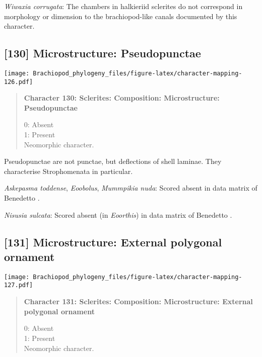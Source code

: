 \documentclass[openany]{book}
\theoremstyle{definition}
\theoremstyle{definition}
\theoremstyle{definition}
\theoremstyle{remark}
\begin{document}
\hypertarget{Wiwaxia_corrugata-coding-129}{}
\emph{Wiwaxia corrugata}: The chambers in halkieriid sclerites do not
correspond in morphology or dimension to the brachiopod-like canals
documented by this character.

\subsection*{{[}130{]} Microstructure:
Pseudopunctae}\label{microstructure-pseudopunctae}

\texttt{[image: Brachiopod\_phylogeny\_files/figure-latex/character-mapping-126.pdf]}

\begin{quote}
\textbf{Character 130: Sclerites: Composition: Microstructure:
Pseudopunctae}

0: Absent\\
1: Present\\
Neomorphic character.
\end{quote}

Pseudopunctae are not punctae, but deflections of shell laminae. They
characterise Strophomenata in particular.

\hypertarget{Askepasma_toddense-coding-130}{}
\emph{Askepasma toddense}, \emph{Eoobolus}, \emph{Mummpikia nuda}:
Scored absent in data matrix of Benedetto
\citeyearpar{Benedetto2009iChaniella}.

\hypertarget{Nisusia_sulcata-coding-130}{}
\emph{Nisusia sulcata}: Scored absent (in \emph{Eoorthis}) in data
matrix of Benedetto \citeyearpar{Benedetto2009iChaniella}.

\subsection*{{[}131{]} Microstructure: External polygonal
ornament}\label{microstructure-external-polygonal-ornament}

\texttt{[image: Brachiopod\_phylogeny\_files/figure-latex/character-mapping-127.pdf]}

\begin{quote}
\textbf{Character 131: Sclerites: Composition: Microstructure: External
polygonal ornament}

0: Absent\\
1: Present\\
Neomorphic character.
\end{quote}
\end{document}

